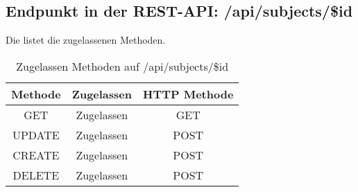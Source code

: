 \subsection{Endpunkt in der REST-API: /api/subjects/\$id}
Die  listet die zugelassenen Methoden. 

\begin{table}[!htbp]
	\begin{tabular}{|c|c|c|}
		\hline
			\textbf{Methode} & \textbf{Zugelassen} & \textbf{HTTP Methode} \\ \hline
			GET & Zugelassen & GET \\ \hline
			UPDATE & Zugelassen & POST \\ \hline 
			CREATE & Zugelassen & POST \\ \hline 
			DELETE & Zugelassen & POST \\ \hline
	\end{tabular}

		\caption{Zugelassen Methoden auf /api/subjects/\$id}
		\label{tab:end:rest:api:subjects:id:meth}
\end{table}